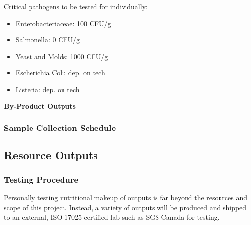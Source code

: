 Critical pathogens to be tested for individually:
\begin{itemize}
    \item Enterobacteriaceae: 100 CFU/g
    \item Salmonella: 0 CFU/g
    \item Yeast and Molds: 1000 CFU/g
    \item Escherichia Coli: dep. on tech
    \item Listeria: dep. on tech
\end{itemize}


\textbf{By-Product Outputs}


\subsubsection{Sample Collection Schedule}




\clearpage

\subsection{Resource Outputs}

\subsubsection{Testing Procedure}

Personally testing nutritional makeup of outputs is far beyond the resources and scope of this project. Instead, a variety of outputs will be produced and shipped to an external, ISO-17025 certified lab such as SGS Canada for testing.

